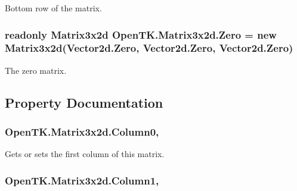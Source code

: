 Bottom row of the matrix. 

\hypertarget{struct_open_t_k_1_1_matrix3x2d_a14e999a630fa86770c5bb9cb6c4d1522}{
\subsubsection[{Zero}]{\setlength{\rightskip}{0pt plus 5cm}readonly {\bf Matrix3x2d} Open\-T\-K.\-Matrix3x2d.\-Zero = new {\bf Matrix3x2d}(Vector2d.\-Zero, Vector2d.\-Zero, Vector2d.\-Zero)\hspace{0.3cm}{\ttfamily [static]}}}\label{struct_open_t_k_1_1_matrix3x2d_a14e999a630fa86770c5bb9cb6c4d1522}


The zero matrix. 



\subsection{Property Documentation}
\hypertarget{struct_open_t_k_1_1_matrix3x2d_a4de9eacd35e50dbfeef44c543d2b57d4}{
\subsubsection[{Column0}]{ Open\-T\-K.\-Matrix3x2d.\-Column0\hspace{0.3cm}{\ttfamily [get]}, {\ttfamily [set]}}}\label{struct_open_t_k_1_1_matrix3x2d_a4de9eacd35e50dbfeef44c543d2b57d4}


Gets or sets the first column of this matrix. 

\hypertarget{struct_open_t_k_1_1_matrix3x2d_a08686c198b3aded6d646389df7f7f15b}{
\subsubsection[{Column1}]{ Open\-T\-K.\-Matrix3x2d.\-Column1\hspace{0.3cm}{\ttfamily [get]}, {\ttfamily [set]}}}\label{struct_open_t_k_1_1_matrix3x2d_a08686c198b3aded6d646389df7f7f15b}


